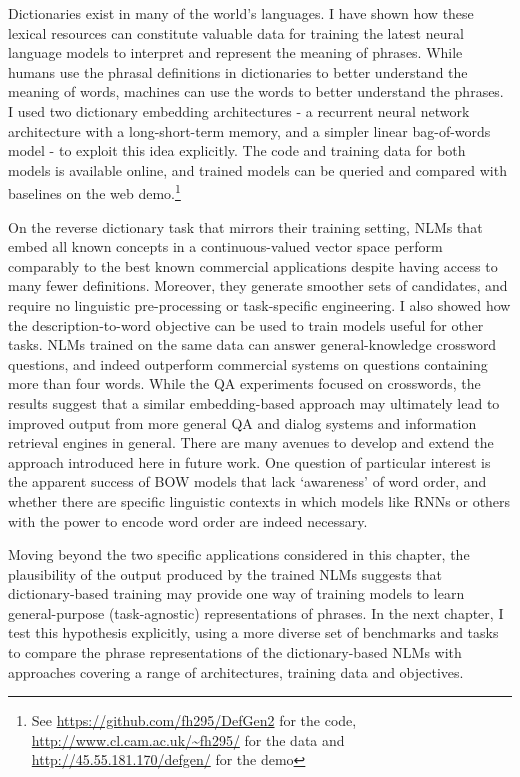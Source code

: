 Dictionaries exist in many of the world's languages. I have shown how these lexical resources can constitute valuable data for training the latest neural language models to interpret and represent the meaning of phrases. While humans use the phrasal definitions in dictionaries to better understand the meaning of words, machines can use the words to better understand the phrases. I used two dictionary embedding architectures - a recurrent neural network architecture with a long-short-term memory, and a simpler linear bag-of-words model - to exploit this idea explicitly. The code and training data for both models is available online, and trained models can be queried and compared with baselines on the web demo.\footnote{See \url{https://github.com/fh295/DefGen2} for the code, \url{http://www.cl.cam.ac.uk/~fh295/} for the data and \url{http://45.55.181.170/defgen/} for the demo}

On the reverse dictionary task that mirrors their training setting, NLMs that embed all known concepts in a continuous-valued vector space perform comparably to the best known commercial applications despite having access to many fewer definitions. Moreover, they generate smoother sets of candidates, and require no linguistic pre-processing or task-specific engineering. I also showed how the description-to-word objective can be used to train models useful for other tasks. NLMs trained on the same data can answer general-knowledge crossword questions, and indeed outperform commercial systems on questions containing more than four words. While the QA experiments focused on crosswords, the results suggest that a similar embedding-based approach may ultimately lead to improved output from more general QA and dialog systems and information retrieval engines in general. There are many avenues to develop and extend the approach introduced here in future work. One question of particular interest is the apparent success of BOW models that lack `awareness' of word order, and whether there are specific linguistic contexts in which models like RNNs or others with the power to encode word order are indeed necessary.  

Moving beyond the two specific applications considered in this chapter, the plausibility of the output produced by the trained NLMs suggests that dictionary-based training may provide one way of training models to learn general-purpose (task-agnostic) representations of phrases. In the next chapter, I test this hypothesis explicitly, using a more diverse set of benchmarks and tasks to compare the phrase representations of the dictionary-based NLMs with approaches covering a range of architectures, training data and objectives. 

